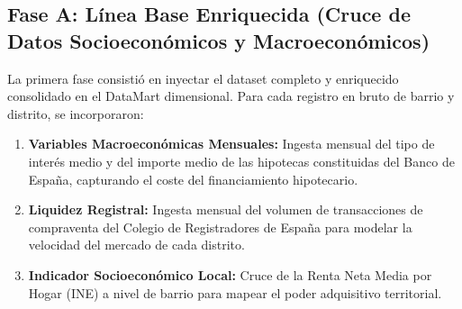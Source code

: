 \documentclass[a4paper,11pt,openany]{book}
\begin{document}
\subsection{Fase A: Línea Base Enriquecida (Cruce de Datos Socioeconómicos y Macroeconómicos)}
La primera fase consistió en inyectar el dataset completo y enriquecido consolidado en el DataMart dimensional. Para cada registro en bruto de barrio y distrito, se incorporaron:
\begin{enumerate}
    \item \textbf{Variables Macroeconómicas Mensuales:} Ingesta mensual del tipo de interés medio y del importe medio de las hipotecas constituidas del Banco de España, capturando el coste del financiamiento hipotecario.
    \item \textbf{Liquidez Registral:} Ingesta mensual del volumen de transacciones de compraventa del Colegio de Registradores de España para modelar la velocidad del mercado de cada distrito.
    \item \textbf{Indicador Socioeconómico Local:} Cruce de la Renta Neta Media por Hogar (INE) a nivel de barrio para mapear el poder adquisitivo territorial.
\end{enumerate}

\begin{table}[H]
\centering
\caption{Matriz de rendimiento comparativa: Fase A - Línea Base Enriquecida - Mercado de Venta (€/m\textsuperscript{2})}
\label{tab:fasea_venta}
\end{table}
\end{document}
